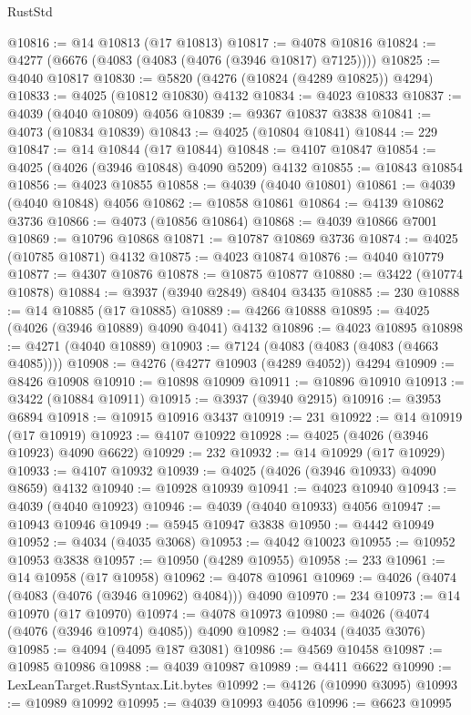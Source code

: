 \begin{lexlean}{RustStd}
\begin{coremodule}
@10816 := @14 @10813 (@17 @10813)
@10817 := @4078 @10816
@10824 := @4277 (@6676 (@4083 (@4083 (@4076 (@3946 @10817) @7125))))
@10825 := @4040 @10817
@10830 := @5820 (@4276 (@10824 (@4289 @10825)) @4294)
@10833 := @4025 (@10812 @10830) @4132
@10834 := @4023 @10833
@10837 := @4039 (@4040 @10809) @4056
@10839 := @9367 @10837 @3838
@10841 := @4073 (@10834 @10839)
@10843 := @4025 (@10804 @10841)
@10844 := 229
@10847 := @14 @10844 (@17 @10844)
@10848 := @4107 @10847
@10854 := @4025 (@4026 (@3946 @10848) @4090 @5209) @4132
@10855 := @10843 @10854
@10856 := @4023 @10855
@10858 := @4039 (@4040 @10801)
@10861 := @4039 (@4040 @10848) @4056
@10862 := @10858 @10861
@10864 := @4139 @10862 @3736
@10866 := @4073 (@10856 @10864)
@10868 := @4039 @10866 @7001
@10869 := @10796 @10868
@10871 := @10787 @10869 @3736
@10874 := @4025 (@10785 @10871) @4132
@10875 := @4023 @10874
@10876 := @4040 @10779
@10877 := @4307 @10876
@10878 := @10875 @10877
@10880 := @3422 (@10774 @10878)
@10884 := @3937 (@3940 @2849) @8404 @3435
@10885 := 230
@10888 := @14 @10885 (@17 @10885)
@10889 := @4266 @10888
@10895 := @4025 (@4026 (@3946 @10889) @4090 @4041) @4132
@10896 := @4023 @10895
@10898 := @4271 (@4040 @10889)
@10903 := @7124 (@4083 (@4083 (@4083 (@4663 @4085))))
@10908 := @4276 (@4277 @10903 (@4289 @4052)) @4294
@10909 := @8426 @10908
@10910 := @10898 @10909
@10911 := @10896 @10910
@10913 := @3422 (@10884 @10911)
@10915 := @3937 (@3940 @2915)
@10916 := @3953 @6894
@10918 := @10915 @10916 @3437
@10919 := 231
@10922 := @14 @10919 (@17 @10919)
@10923 := @4107 @10922
@10928 := @4025 (@4026 (@3946 @10923) @4090 @6622)
@10929 := 232
@10932 := @14 @10929 (@17 @10929)
@10933 := @4107 @10932
@10939 := @4025 (@4026 (@3946 @10933) @4090 @8659) @4132
@10940 := @10928 @10939
@10941 := @4023 @10940
@10943 := @4039 (@4040 @10923)
@10946 := @4039 (@4040 @10933) @4056
@10947 := @10943 @10946
@10949 := @5945 @10947 @3838
@10950 := @4442 @10949
@10952 := @4034 (@4035 @3068)
@10953 := @4042 @10023
@10955 := @10952 @10953 @3838
@10957 := @10950 (@4289 @10955)
@10958 := 233
@10961 := @14 @10958 (@17 @10958)
@10962 := @4078 @10961
@10969 := @4026 (@4074 (@4083 (@4076 (@3946 @10962) @4084))) @4090
@10970 := 234
@10973 := @14 @10970 (@17 @10970)
@10974 := @4078 @10973
@10980 := @4026 (@4074 (@4076 (@3946 @10974) @4085)) @4090
@10982 := @4034 (@4035 @3076)
@10985 := @4094 (@4095 @187 @3081)
@10986 := @4569 @10458
@10987 := @10985 @10986
@10988 := @4039 @10987
@10989 := @4411 @6622
@10990 := LexLeanTarget.RustSyntax.Lit.bytes
@10992 := @4126 (@10990 @3095)
@10993 := @10989 @10992
@10995 := @4039 @10993 @4056
@10996 := @6623 @10995

\end{coremodule}
\end{lexlean}
